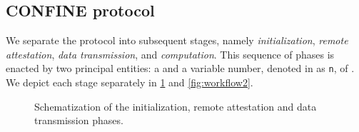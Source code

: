 \subsection{CONFINE protocol}

We separate the protocol into subsequent stages, namely \textit{initialization}, \textit{remote attestation}, \textit{data transmission}, and \textit{computation}. This sequence of phases is enacted by two principal entities: a  and a variable number, denoted in as \texttt{n}, of . We depict each stage separately in \cref{fig:workflow} and \cref{fig:workflow2}.

\begin{figure}[t]
	\hfill
	\hfill
	\hfill
	\caption{Schematization of the initialization, remote attestation and data transmission phases.}
	\label{fig:workflow}
\end{figure}

